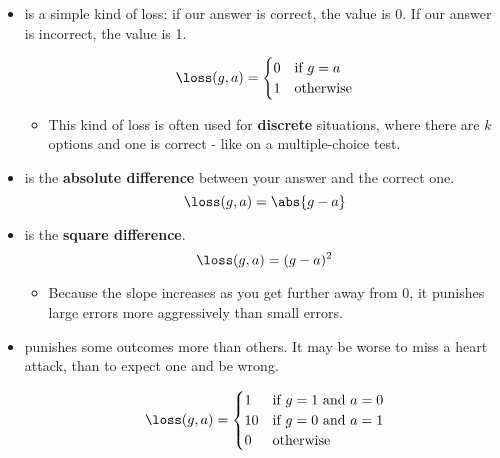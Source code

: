         \begin{itemize}
            \item {} is a simple kind of loss: if our answer is correct, the value is 0. If our answer is incorrect, the value is 1.
                
                \[\loss(g, a) = \begin{cases}
                 0 & \text{if $g = a$} \\
                 1 & \text{otherwise}
                \end{cases}\]
            
                \begin{itemize}
                    \item This kind of loss is often used for \textbf{discrete} situations, where there are $k$ options and one is correct - like on a multiple-choice test.
                \end{itemize}
                
            \item {} is the \textbf{absolute difference} between your answer and the correct one.
                \begin{equation}
                    \loss(g,a) = \abs{g-a}
                \end{equation}
                
            \item {} is the \textbf{square difference}.
                \begin{equation}
                    \loss(g,a) = (g-a)^2
                \end{equation}
                
                \begin{itemize}
                    \item Because the slope increases as you get further away from 0, it punishes large errors more aggressively than small errors.
                \end{itemize}
            
            \item {} punishes some outcomes more than others. It may be worse to miss a heart attack, than to expect one and be wrong.
            
            \[\loss(g, a) = \begin{cases}
                         1 & \text{if $g = 1$ and $a = 0$} \\
                         10 & \text{if $g = 0$ and $a = 1$} \\
                         0 & \text{otherwise}
                        \end{cases}\]
            
        \end{itemize}
        

